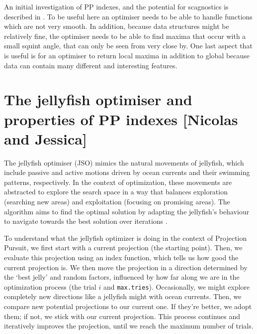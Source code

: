 \documentclass[
  number,
  preprint,
  3p]{elsarticle}
\begin{document}
An initial investigation of PP indexes, and the potential for
scagnostics is described in \citet{laa_using_2020}. To be useful here an
optimiser needs to be able to handle functions which are not very
smooth. In addition, because data structures might be relatively fine,
the optimiser needs to be able to find maxima that occur with a small
squint angle, that can only be seen from very close by. One last aspect
that is useful is for an optimiser to return local maxima in addition to
global because data can contain many different and interesting features.

\section{The jellyfish optimiser and properties of PP indexes {[}Nicolas
and Jessica{]}}\label{sec-theory}

The jellyfish optimiser (JSO) mimics the natural movements of jellyfish,
which include passive and active motions driven by ocean currents and
their swimming patterns, respectively. In the context of optimization,
these movements are abstracted to explore the search space in a way that
balances exploration (searching new areas) and exploitation (focusing on
promising areas). The algorithm aims to find the optimal solution by
adapting the jellyfish's behaviour to navigate towards the best solution
over iterations \citep{chou_novel_2021}.

To understand what the jellyfish optimizer is doing in the context of
Projection Pursuit, we first start with a current projection (the
starting point). Then, we evaluate this projection using an index
function, which tells us how good the current projection is. We then
move the projection in a direction determined by the `best jelly' and
random factors, influenced by how far along we are in the optimization
process (the trial \(i\) and \texttt{max.tries}). Occasionally, we might
explore completely new directions like a jellyfish might with ocean
currents. Then, we compare new potential projections to our current one.
If they're better, we adopt them; if not, we stick with our current
projection. This process continues and iteratively improves the
projection, until we reach the maximum number of trials.
\end{document}
